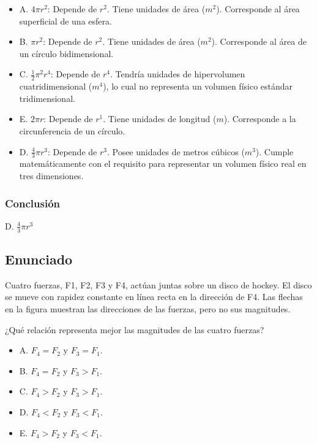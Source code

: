 \documentclass[12pt, a4paper]{article}
\begin{document}
\begin{itemize}
    \item A. $4\pi r^2$: Depende de $r^2$. Tiene unidades de área ($m^2$). Corresponde al área superficial de una esfera.
    \item B. $\pi r^2$: Depende de $r^2$. Tiene unidades de área ($m^2$). Corresponde al área de un círculo bidimensional.
    \item C. $\frac{1}{2}\pi^2 r^4$: Depende de $r^4$. Tendría unidades de hipervolumen cuatridimensional ($m^4$), lo cual no representa un volumen físico estándar tridimensional.
    \item E. $2\pi r$: Depende de $r^1$. Tiene unidades de longitud ($m$). Corresponde a la circunferencia de un círculo.
    \item D. $\frac{4}{3}\pi r^3$: Depende de $r^3$. Posee unidades de metros cúbicos ($m^3$). Cumple matemáticamente con el requisito para representar un volumen físico real en tres dimensiones.
\end{itemize}

\subsubsection*{Conclusión}

D. $\frac{4}{3}\pi r^3$

\newpage

\subsection*{Enunciado}

 Cuatro fuerzas, F1, F2, F3 y F4, actúan juntas sobre un disco de hockey. El disco se mueve con rapidez constante en línea recta en la dirección de F4. Las flechas en la figura muestran las direcciones de las fuerzas, pero no sus magnitudes.

¿Qué relación representa mejor las magnitudes de las cuatro fuerzas?

\begin{itemize}
    \item A. $F_4 = F_2$ y $F_3 = F_1$.
    \item B. $F_4 = F_2$ y $F_3 > F_1$.
    \item C. $F_4 > F_2$ y $F_3 > F_1$.
    \item D. $F_4 < F_2$ y $F_3 < F_1$.
    \item E. $F_4 > F_2$ y $F_3 < F_1$.
\end{itemize}
\end{document}
